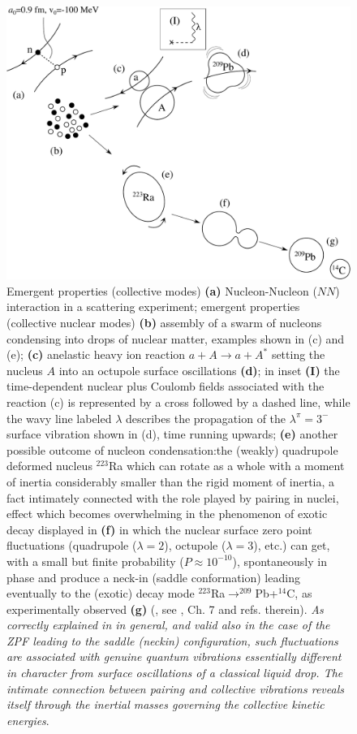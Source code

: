 \begin{figure}
	\centerline {
		\includegraphics*[width=15cm]{introduccion/figs/figpreface2-v2}
	}
	\caption{Emergent properties (collective modes) \textbf{(a)} Nucleon-Nucleon ($NN$) interaction in a scattering experiment; emergent properties (collective nuclear modes) \textbf{(b)} assembly of a swarm of nucleons condensing into drops of nuclear matter, examples shown in (c) and (e); \textbf{(c)} anelastic heavy ion reaction $a+A\to a+A^*$ setting the nucleus $A$ into an octupole surface oscillations \textbf{(d)}; in inset \textbf{(I)} the time-dependent nuclear plus Coulomb fields associated with the reaction (c) is represented by a cross followed by a dashed line, while the wavy line labeled $\lambda$ describes the propagation of the $\lambda^\pi=3^-$ surface vibration shown in (d), time running upwards; \textbf{(e)} another possible outcome of nucleon condensation:the (weakly) quadrupole deformed nucleus $^{223}$Ra which can rotate as a whole with a moment of inertia considerably smaller than the rigid moment of inertia, a fact intimately connected with the role played by pairing in nuclei, effect which becomes overwhelming in the phenomenon of exotic decay displayed in \textbf{(f)} in which the nuclear  surface zero point fluctuations  (quadrupole ($\lambda=2$), octupole ($\lambda=3$), etc.) can get, with a small but finite probability ($P\approx10^{-10}$), spontaneously in phase and produce a neck-in (saddle conformation) leading eventually to the (exotic) decay mode  $^{223}$Ra$\to^{209}$Pb+$^{14}$C, as experimentally observed \textbf{(g)} (\cite{Rose:84}, see \cite{Brink:05}, Ch. 7 and refs. therein). \textit{As correctly explained in \cite{Matsuyanagi:13} in general, and valid also in the case of the ZPF leading to the saddle (neckin) configuration, such fluctuations are associated with genuine quantum vibrations essentially different in character from surface oscillations of a classical liquid drop. The intimate connection between pairing and collective vibrations reveals itself through the inertial masses governing the collective kinetic energies}.}
	\label{fig1.0.2}
\end{figure}
